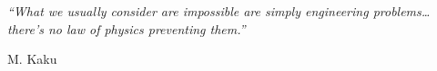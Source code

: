

\epigraph{\textit{``What we usually consider are impossible are simply engineering problems\dots there's no law of physics preventing them.''}}{\textmd{M. Kaku} \cite{Jha2009a}}

